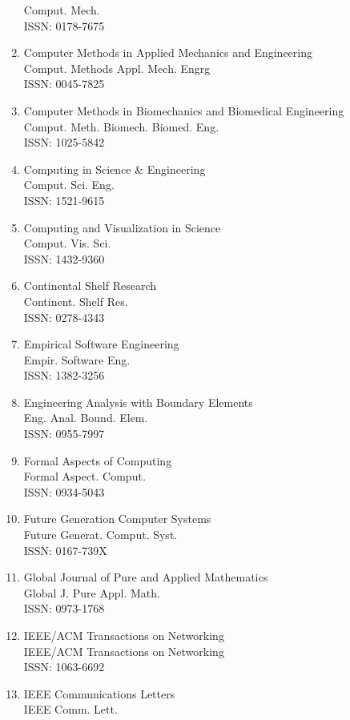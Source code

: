 \begin{enumerate}
 Comput. Mech.\\
 ISSN: 0178-7675
\item
 Computer Methods in Applied Mechanics and Engineering\\
 Comput. Methods Appl. Mech. Engrg\\
 ISSN: 0045-7825
\item
 Computer Methods in Biomechanics and Biomedical Engineering\\
 Comput. Meth. Biomech. Biomed. Eng.\\
 ISSN: 1025-5842
\item
 Computing in Science \& Engineering\\
 Comput. Sci. Eng.\\
 ISSN: 1521-9615
\item
 Computing and Visualization in Science\\
 Comput. Vis. Sci.\\
 ISSN: 1432-9360
\item
 Continental Shelf Research\\
 Continent. Shelf Res.\\
 ISSN: 0278-4343
\item
 Empirical Software Engineering\\
 Empir. Software Eng.\\
 ISSN: 1382-3256
\item
 Engineering Analysis with Boundary Elements\\
 Eng. Anal. Bound. Elem.\\
 ISSN: 0955-7997
\item
 Formal Aspects of Computing\\
 Formal Aspect. Comput.\\
 ISSN: 0934-5043
\item
 Future Generation Computer Systems\\
 Future Generat. Comput. Syst.\\
 ISSN: 0167-739X
\item
 Global Journal of Pure and Applied Mathematics\\
 Global J. Pure Appl. Math.\\
 ISSN: 0973-1768
\item
 IEEE/ACM Transactions on Networking\\
 IEEE/ACM Transactions on Networking\\
 ISSN: 1063-6692
\item
 IEEE Communications Letters\\
 IEEE Comm. Lett.\\

\end{enumerate}

